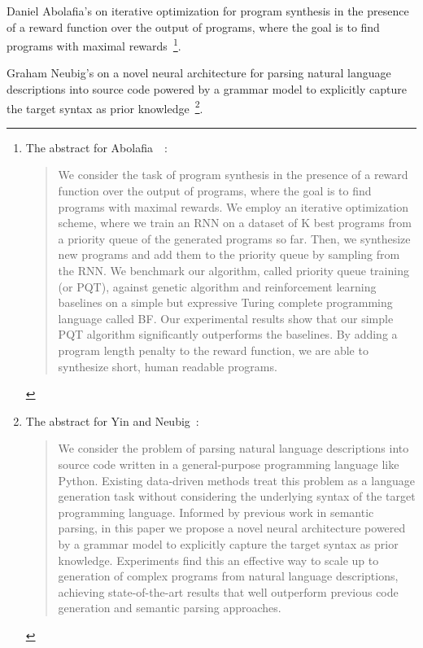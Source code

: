 

Daniel Abolafia's {} on iterative optimization for program synthesis in the presence of a reward function over the output of programs, where the goal is to find programs with maximal rewards~\cite{AbolafiaetalCoRR-18}\footnote{%
%
  The abstract for Abolafia~\etal{}~\cite{AbolafiaetalCoRR-18}:
%
  \begin{quotation}
%
    We consider the task of program synthesis in the presence of a reward function over the output of programs, where the goal is to find programs with maximal rewards. We employ an iterative optimization scheme, where we train an RNN on a dataset of K best programs from a priority queue of the generated programs so far. Then, we synthesize new programs and add them to the priority queue by sampling from the RNN. We benchmark our algorithm, called priority queue training (or PQT), against genetic algorithm and reinforcement learning baselines on a simple but expressive Turing complete programming language called BF. Our experimental results show that our simple PQT algorithm significantly outperforms the baselines. By adding a program length penalty to the reward function, we are able to synthesize short, human readable programs.
%
  \end{quotation}}.

Graham Neubig's {} on a novel neural architecture for parsing natural language descriptions into source code powered by a grammar model to explicitly capture the target syntax as prior knowledge~\cite{YinandNeubigACL-17}\footnote{%
%
  The abstract for Yin and Neubig~\cite{YinandNeubigACL-17}:
%
  \begin{quotation}
%
    We consider the problem of parsing natural language descriptions into source code written in a general-purpose programming language like Python. Existing data-driven methods treat this problem as a language generation task without considering the underlying syntax of the target programming language. Informed by previous work in semantic parsing, in this paper we propose a novel neural architecture powered by a grammar model to explicitly capture the target syntax as prior knowledge. Experiments find this an effective way to scale up to generation of complex programs from natural language descriptions, achieving state-of-the-art results that well outperform previous code generation and semantic parsing approaches.
%
  \end{quotation}}.

